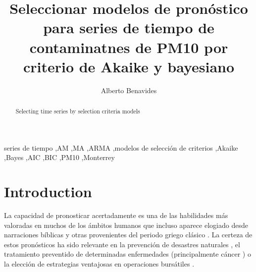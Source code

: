 \documentclass{elsarticle}
\begin{document}
\begin{frontmatter}

\title{Seleccionar modelos de pronóstico para series de tiempo de contaminatnes de PM10 por criterio de Akaike y bayesiano}

\author{Alberto Benavides}
\address{Nuevo León, México}




\begin{abstract}
Selecting time series by selection criteria models
\end{abstract}

\begin{keyword}
series de tiempo \sep AM \sep MA \sep ARMA \sep modelos de selección de criterios \sep Akaike \sep Bayes \sep AIC \sep BIC \sep PM10 \sep Monterrey
\end{keyword}

\end{frontmatter}


\section{Introduction}

La capacidad de pronosticar acertadamente es una de las habilidades más valoradas en muchos de los ámbitos humanos que incluso aparece elogiado desde narraciones bíblicas y otras provenientes del periodo griego clásico \cite{Hyndman2018}. La certeza de estos pronósticos ha sido relevante en la prevención de desastres naturales \cite{Cheng2007}, el tratamiento preventido de determinadas enfermedades (principalmente cáncer \cite{Earnest2019, Kumar2014}) o la elección de estrategias ventajosas en operaciones bursátiles \cite{BabuASReddy2015, Xiao2014}. 
\end{document}
